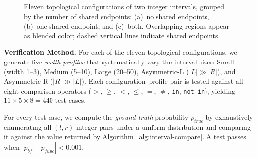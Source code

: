 \documentclass[pdflatex,sn-basic]{sn-jnl}%
\theoremstyle{thmstyleone}%
\theoremstyle{thmstyletwo}%
\theoremstyle{thmstylethree}%
\begin{document}
\begin{figure}[t]
\caption{Eleven topological configurations of two integer intervals,
grouped by the number of shared endpoints:
(a)~no shared endpoints, (b)~one shared endpoint, and (c)~both.
Overlapping regions appear as blended color;
dashed vertical lines indicate shared endpoints.}
\label{fig:interval-topologies}
\end{figure}

\smallskip
\noindent\textbf{Verification Method.} For each of the eleven topological configurations, we generate five
\emph{width profiles} that systematically vary the interval sizes:
Small (width 1--3), Medium (5--10), Large (20--50), Asymmetric-L
($|L| \gg |R|$), and Asymmetric-R ($|R| \gg |L|$).
Each configuration--profile pair is tested against all eight comparison
operators ($>$, $\geq$, $<$, $\leq$, $=$, $\neq$, \texttt{in},
\texttt{not\,in}), yielding $11 \times 5 \times 8 = 440$ test cases.

For every test case, we compute the \emph{ground-truth} probability
$p_{\mathit{true}}$ by exhaustively enumerating all $(l, r)$ integer
pairs under a uniform distribution and comparing it against the value
returned by Algorithm~\ref{alg:interval-compare}.
A test passes when $|p_{\mathit{bf}} - p_{\mathit{func}}| < 0.001$.
\end{document}
